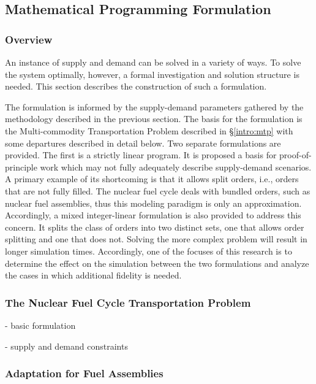 \subsection{Mathematical Programming Formulation}\label{abm:dre:form}

\subsubsection{Overview}

An instance of supply and demand can be solved in a variety of ways. To solve
the system optimally, however, a formal investigation and solution structure is
needed. This section describes the construction of such a formulation.

The formulation is informed by the supply-demand parameters gathered by the
methodology described in the previous section. The basis for the formulation is
the Multi-commodity Transportation Problem described in \S\ref{intro:mtp} with
some departures described in detail below. Two separate formulations are
provided. The first is a strictly linear program. It is proposed a basis for
proof-of-principle work which may not fully adequately describe supply-demand
scenarios. A primary example of its shortcoming is that it allows split orders,
i.e., orders that are not fully filled. The nuclear fuel cycle deals with
bundled orders, such as nuclear fuel assemblies, thus this modeling paradigm is
only an approximation. Accordingly, a mixed integer-linear formulation is also
provided to address this concern. It splits the class of orders into two
distinct sets, one that allows order splitting and one that does not. Solving
the more complex problem will result in longer simulation times.  Accordingly,
one of the focuses of this research is to determine the effect on the simulation
between the two formulations and analyze the cases in which additional fidelity
is needed.

\subsubsection{The Nuclear Fuel Cycle Transportation Problem}

- basic formulation

- supply and demand constraints

\subsubsection{Adaptation for Fuel Assemblies}

